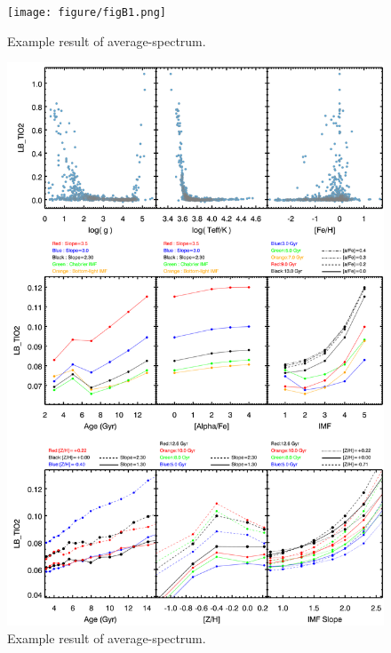 \documentclass[preprint]{aastex}
\begin{document}
\begin{CJK*}{UTF8}{gbsn}
\clearpage
{}
\begin{figure}
    \centering 
    \texttt{[image: figure/figB1.png]}
    \caption{
    Example result of average-spectrum. 
    }
    \label{figure:B1}
\end{figure}

\clearpage
{}
\begin{figure}
    \centering 
    \includegraphics[width=13cm]{figure/figC1.png}
    \caption{
    Example result of average-spectrum. 
    }
    \label{figure:C1}
\end{figure}


\end{CJK*}

%

%
\end{document}
